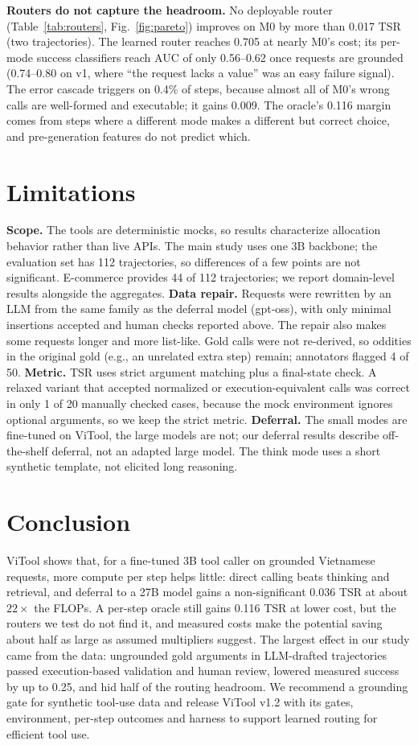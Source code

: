 \documentclass[conference,a4paper]{IEEEtran}
\begin{document}
\textbf{Routers do not capture the headroom.} No deployable router
(Table~\ref{tab:routers}, Fig.~\ref{fig:pareto}) improves on M0 by more than
0.017 TSR (two trajectories). The learned router reaches 0.705 at nearly M0's cost; its per-mode
success classifiers reach AUC of only 0.56--0.62 once requests are grounded
(0.74--0.80 on v1, where ``the request lacks a value'' was an easy failure
signal). The error cascade triggers on 0.4\% of steps, because almost all of
M0's wrong calls are well-formed and executable; it gains 0.009. The oracle's
0.116 margin comes from steps where a different mode makes a different but
correct choice, and pre-generation features do not predict which.

\section{Limitations}
\label{sec:limitations}
\textbf{Scope.} The tools are deterministic mocks, so results characterize
allocation behavior rather than live APIs. The main study uses one 3B backbone;
the evaluation set has 112 trajectories, so differences of a few points are not
significant. E-commerce provides 44 of 112 trajectories; we report
domain-level results alongside the aggregates.
\textbf{Data repair.} Requests were rewritten by an LLM from the same family as
the deferral model (gpt-oss), with only minimal insertions accepted and human
checks reported above. The repair also makes some requests longer and more
list-like. Gold calls were not re-derived, so oddities in the original gold
(e.g., an unrelated extra step) remain; annotators flagged 4 of 50.
\textbf{Metric.} TSR uses strict argument matching plus a final-state check. A
relaxed variant that accepted normalized or execution-equivalent calls was
correct in only 1 of 20 manually checked cases, because the mock environment
ignores optional arguments, so we keep the strict metric.
\textbf{Deferral.} The small modes are fine-tuned on ViTool, the large models
are not; our deferral results describe off-the-shelf deferral, not an adapted
large model. The think mode uses a short synthetic template, not elicited
long reasoning.

\section{Conclusion}
ViTool shows that, for a fine-tuned 3B tool caller on grounded Vietnamese
requests, more compute per step helps little: direct calling beats thinking
and retrieval, and deferral to a 27B model gains a non-significant 0.036 TSR at
about $22\times$ the FLOPs. A per-step oracle
still gains 0.116 TSR at lower cost, but the routers we test do not find it,
and measured costs make the potential saving about half as large as assumed
multipliers suggest. The largest effect in our study came from the data:
ungrounded gold arguments in LLM-drafted trajectories passed execution-based
validation and human review, lowered measured success by up to 0.25, and hid
half of the routing headroom. We recommend a grounding gate for synthetic
tool-use data and release ViTool v1.2 with its gates, environment, per-step
outcomes and harness to support learned routing for efficient tool use.
\end{document}
